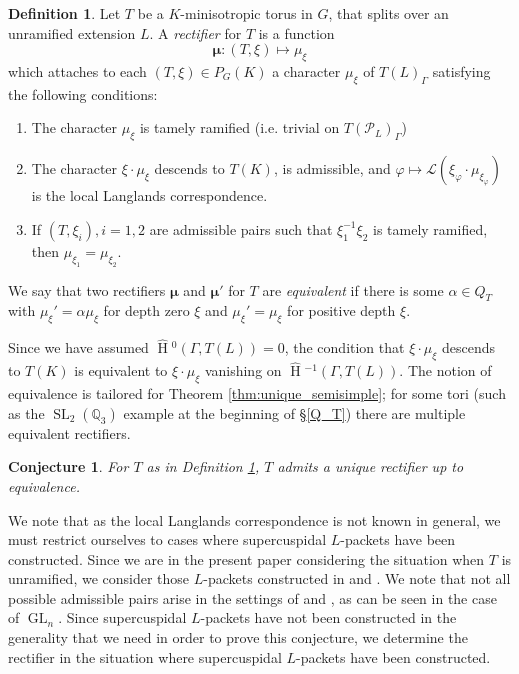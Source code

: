 \documentclass[11pt]{amsart}
\theoremstyle{plain}
\newtheorem{conjecture}[theorem]{Conjecture}
\newcommand{\HT}[1]{\hat{\HH}{}^{#1}}
\theoremstyle{definition}
\newtheorem{definition}[theorem]{Definition}
\DeclareMathOperator{\HH}{H}
\DeclareMathOperator{\GL}{GL}
\DeclareMathOperator{\SL}{SL}
\newcommand{\PL}{\mathcal{P}_L}
\newcommand{\Lpack}{\mathcal{L}}
\newcommand{\bmu}{\boldsymbol\mu}
\begin{document}
\begin{definition} \label{def:rectifier}
  Let $T$ be a $K$-minisotropic torus in $G$, that splits over an unramified
  extension $L$.  A \emph{rectifier} for $T$ is a function
  $$\bmu : (T, \xi) \mapsto \mu_{\xi}$$
  which attaches to each $(T, \xi) \in P_G(K)$ a character
  $\mu_{\xi}$ of $T(L)_{\Gamma}$ satisfying the following conditions:

\begin{enumerate}
\item The character $\mu_{\xi}$ is tamely ramified (i.e. trivial on
  $T(\PL)_{\Gamma}$)

\item The character $\xi \cdot \mu_{\xi}$ descends to $T(K)$, is admissible,
and $\varphi \mapsto \Lpack(\xi_{\varphi} \cdot \mu_{\xi_{\varphi}})$
  is the local Langlands correspondence.

\item If $(T, \xi_i), i = 1,2$ are admissible pairs  such that
$\xi_1^{-1} \xi_2$ is tamely ramified, then
$\mu_{\xi_1} = \mu_{\xi_2}$.
\end{enumerate}
We say that two rectifiers $\bmu$ and $\bmu'$ for $T$ are \emph{equivalent}
if there is some $\alpha \in Q_T$ with $\mu_\xi' = \alpha \mu_\xi$ for depth zero $\xi$
and $\mu_\xi' = \mu_\xi$ for positive depth $\xi$.

\end{definition}

Since we have assumed $\HT{0}(\Gamma,T(L)) = 0$, the condition that $\xi \cdot \mu_\xi$
descends to $T(K)$ is equivalent to $\xi \cdot \mu_\xi$ vanishing on $\HT{-1}(\Gamma, T(L))$.  The
notion of equivalence is tailored for Theorem \ref{thm:unique_semisimple}; for some tori (such as the
$\SL_2(\mathbb{Q}_3)$ example at the beginning of \S \ref{Q_T}) there are
multiple equivalent rectifiers.

\begin{conjecture} \label{conj:unique_rectifier}
For $T$ as in Definition \ref{def:rectifier}, $T$ admits a unique rectifier up to equivalence.
\end{conjecture}

We note that as the local Langlands correspondence is not known in general, we must restrict
ourselves to cases where supercuspidal $L$-packets have been constructed.
Since we are in the present paper considering the situation when $T$ is unramified,
we consider those $L$-packets constructed in \cite{reeder-debacker:09a} and \cite{reeder:08a}.
We note that not all possible admissible pairs arise in the settings
of \cite{reeder-debacker:09a} and \cite{reeder:08a}, as can be seen in the case of $\GL_n$.
Since supercuspidal $L$-packets have not been constructed in the generality that
we need in order to prove this conjecture, we determine
the rectifier in the situation where supercuspidal $L$-packets have been
constructed.
\end{document}
